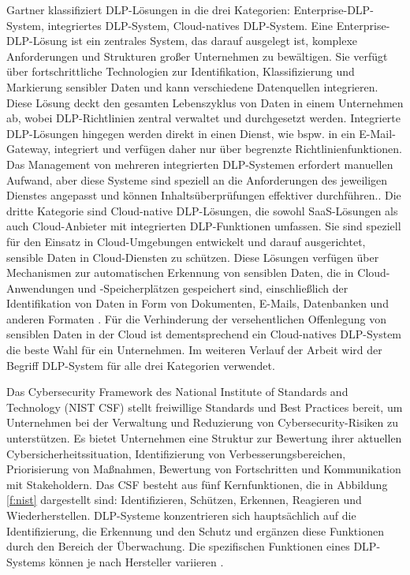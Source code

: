 Gartner klassifiziert DLP-Lösungen in die drei Kategorien: Enterprise-DLP-System, integriertes DLP-System, Cloud-natives DLP-System. Eine Enterprise-DLP-Lösung ist ein zentrales System, das darauf ausgelegt ist, komplexe Anforderungen und Strukturen großer Unternehmen zu bewältigen. Sie verfügt über fortschrittliche Technologien zur Identifikation, Klassifizierung und Markierung sensibler Daten und kann verschiedene Datenquellen integrieren. Diese Lösung deckt den gesamten Lebenszyklus von Daten in einem Unternehmen ab, wobei DLP-Richtlinien zentral verwaltet und durchgesetzt werden.
Integrierte DLP-Lösungen hingegen werden direkt in einen Dienst, wie bspw. in ein E-Mail-Gateway, integriert und verfügen daher nur über begrenzte Richtlinienfunktionen. Das Management von mehreren integrierten DLP-Systemen erfordert manuellen Aufwand, aber diese Systeme sind speziell an die Anforderungen des jeweiligen Dienstes angepasst und können Inhaltsüberprüfungen effektiver durchführen..
Die dritte Kategorie sind Cloud-native DLP-Lösungen, die sowohl SaaS-Lösungen als auch Cloud-Anbieter mit integrierten DLP-Funktionen umfassen. Sie sind speziell für den Einsatz in Cloud-Umgebungen entwickelt und darauf ausgerichtet, sensible Daten in Cloud-Diensten zu schützen. Diese Lösungen verfügen über Mechanismen zur automatischen Erkennung von sensiblen Daten, die in Cloud-Anwendungen und -Speicherplätzen gespeichert sind, einschließlich der Identifikation von Daten in Form von Dokumenten, E-Mails, Datenbanken und anderen Formaten \cite{Chugh.2023}.
Für die Verhinderung der versehentlichen Offenlegung von sensiblen Daten in der Cloud ist dementsprechend ein Cloud-natives DLP-System die beste Wahl für ein Unternehmen.
Im weiteren Verlauf der Arbeit wird der Begriff DLP-System für alle drei Kategorien verwendet.

Das Cybersecurity Framework des National Institute of Standards and Technology (NIST CSF) stellt freiwillige Standards und Best Practices bereit, um Unternehmen bei der Verwaltung und Reduzierung von Cybersecurity-Risiken zu unterstützen. Es bietet Unternehmen eine Struktur zur Bewertung ihrer aktuellen Cybersicherheitssituation, Identifizierung von Verbesserungsbereichen, Priorisierung von Maßnahmen, Bewertung von Fortschritten und Kommunikation mit Stakeholdern. Das CSF besteht aus fünf Kernfunktionen, die in Abbildung \ref{f:nist} dargestellt sind: Identifizieren, Schützen, Erkennen, Reagieren und Wiederherstellen.
DLP-Systeme konzentrieren sich hauptsächlich auf die Identifizierung, die Erkennung und den Schutz und ergänzen diese Funktionen durch den Bereich der Überwachung. Die spezifischen Funktionen eines DLP-Systems können je nach Hersteller variieren \cite{NIST.2014}.

